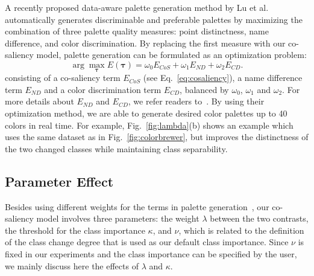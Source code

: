 


A recently proposed data-aware palette generation method by Lu et al.~\cite{Lu21} automatically generates discriminable and preferable palettes by maximizing the combination of three palette quality measures: point distinctness, name difference, and color discrimination.
By replacing the first measure with our co-saliency model, palette generation can be formulated as an optimization problem:
\begin{equation}
\arg\max_{\mathbf{\tau}} E(\mathbf{\tau}) = \omega_0 E_{CoS} + \omega_1 E_{ND} + \omega_2 E_{CD}.
\label{eq:energyfunc}
\end{equation}
consisting of a co-saliency term $E_{CoS}$ (see Eq.~\ref{eq:cosaliency}), a name difference term $E_{ND}$ and a color discrimination term $E_{CD}$, balanced by $\omega_0$, $\omega_1$ and $\omega_2$. For more details about $E_{ND}$ and $E_{CD}$, we refer readers to~\cite{Lu21}. By using their optimization method, we are able to generate desired color palettes up to 40 colors in real time. %
For example, Fig.~\ref{fig:lambda}(b) shows an example which uses the same dataset as in Fig.~\ref{fig:colorbrewer}, but improves the distinctness of the two changed classes while maintaining class separability.



\subsection{Parameter Effect}
\label{subsec:parameter}
Besides using different weights for the terms in palette generation~\cite{Lu21}, our co-saliency model involves three parameters: the weight $\lambda$ between the two contrasts, the threshold for the class importance $\kappa$, and $\nu$, which is related to the definition of the class change degree that is used as our default class importance.
Since $\nu$ is fixed in our experiments and the class importance can be specified by the user, we mainly discuss here the effects of $\lambda$  and $\kappa$.

